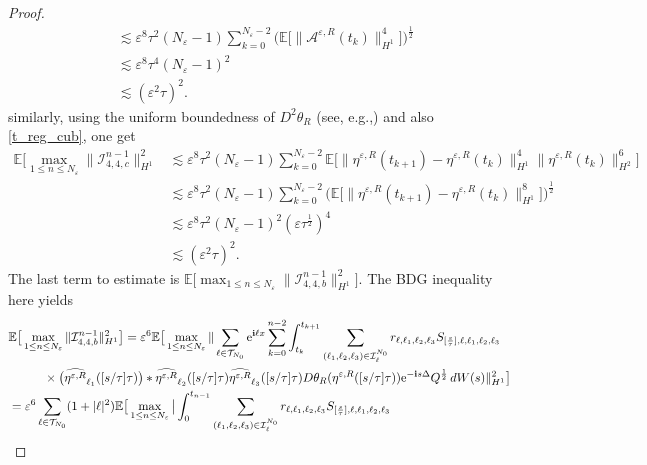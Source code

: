 \documentclass[a4paper]{amsart}
\begin{document}
\begin{proof}
\begin{align*}
       &\lesssim \varepsilon^8 \tau^2 (N_\varepsilon-1)  \sum_{k=0}^{N_\varepsilon-2} \big(\mathbb{E}\big[\|\mathcal{A}^{\varepsilon,R}(t_k)\|^4_{H^1}\big]\big)^{\frac{1}{2}} \\
       &\lesssim \varepsilon^8 \tau^4 (N_\varepsilon-1)^2\\
       &\lesssim (\varepsilon^2\tau)^2.
   \end{align*}
   similarly, using the uniform boundedness of $D^2\theta_R$ (see, e.g.,\cite{deb0}) and also \eqref{t_reg_cub}, one get
   \begin{align*}
       \mathbb{E}\big[\max_{1\le n\le N_\varepsilon}\|\mathcal{I}^{n-1}_{4,4,c}\|^2_{H^1}&\lesssim \varepsilon^8 \tau^2 (N_\varepsilon-1) \sum_{k=0}^{N_\varepsilon-2} \mathbb{E}\big[\|\eta^{\varepsilon,R}(t_{k+1})-\eta^{\varepsilon,R}(t_k)\|_{H^1}^4 \|\eta^{\varepsilon,R}(t_k)\|^6_{H^2}\big]\\
       &\lesssim \varepsilon^8 \tau^2 (N_\varepsilon-1) \sum_{k=0}^{N_\varepsilon-2} \big(\mathbb{E}\big[\|\eta^{\varepsilon,R}(t_{k+1})-\eta^{\varepsilon,R}(t_k)\|_{H^1}^8\big]\big)^{\frac{1}{2}}\\
       &\lesssim   \varepsilon^8 \tau^2 (N_\varepsilon-1)^2 (\varepsilon \tau^{\frac{1}{2}})^4\\
       &\lesssim (\varepsilon^2 \tau)^2.
   \end{align*}
   The last term to estimate is $\mathbb{E}\big[\displaystyle\max_{1\le n\le N_\varepsilon}\|\mathcal{I}^{n-1}_{4,4,b}\|^2_{H^1}\big]$. The BDG inequality here yields
   \begin{align*}
      & \mathbb{E}\big[\max_{1\le n\le N_\varepsilon}\|\mathcal{I}^{n-1}_{4,4,b}\|^2_{H^1}\big]=\varepsilon^6 \mathbb{E}\big[\max_{1\le n\le N_\varepsilon}\|\sum_{\ell\in \mathcal{T}_{N_0}}{\rm e}^{{\bf i}\ell x} \sum_{k=0}^{n-2} \int_{t_k}^{t_{k+1}} 
       \sum_{(\ell_1,\ell_2,\ell_3)\in\mathcal{I}_{\ell}^{N_0}} r_{\ell,\ell_1,\ell_2,\ell_3}S_{[\frac{s}{\tau}],\ell,\ell_1,\ell_2,\ell_3}\\
       &\hspace{1cm}  \times \big(\widehat{\eta^{\varepsilon,R}}_{\ell_1}([s/\tau]\tau)\big)*\widehat{\eta^{\varepsilon,R}}_{\ell_2}([s/\tau]\tau)\widehat{\eta^{\varepsilon,R}}_{\ell_3}([s/\tau]\tau) D\theta_R(\eta^{\varepsilon,R}([s/\tau]\tau)){{\rm e}}^{-{\bf i}s\Delta}Q^{\frac{1}{2}}\,dW(s)\|^2_{H^1}\big]\\
       &= \varepsilon^6 \sum_{\ell\in\mathcal{T}_{N_0}}(1+|\ell|^2)\mathbb{E}\big[\max_{1\le n\le N_\varepsilon}\big|\int_0^{t_{n-1}} \sum_{(\ell_1,\ell_2,\ell_3)\in\mathcal{I}_{\ell}^{N_0}}r_{\ell,\ell_1,\ell_2,\ell_3}S_{[\frac{s}{\tau}],\ell,\ell_1,\ell_2,\ell_3}\\

\end{align*}
\end{proof}
\end{document}
